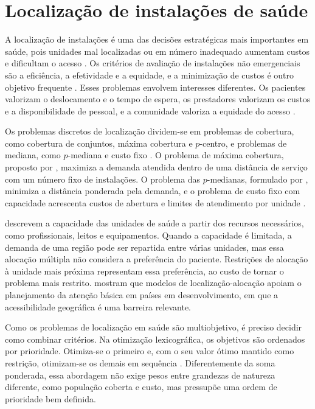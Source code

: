 \documentclass[12pt,a4paper,oneside]{report}
\begin{document}
\section{Localização de instalações de saúde}\label{sec:revlocal}

A localização de instalações é uma das decisões estratégicas mais importantes em saúde, pois unidades
mal localizadas ou em número inadequado aumentam custos e dificultam o acesso \citep{ahmadi2017}. Os
critérios de avaliação de instalações não emergenciais são a eficiência, a efetividade e a equidade, e a
minimização de custos é outro objetivo frequente \citep{ahmadi2017}. Esses problemas envolvem interesses
diferentes. Os pacientes valorizam o deslocamento e o tempo de espera, os prestadores valorizam os custos
e a disponibilidade de pessoal, e a comunidade valoriza a equidade do acesso \citep{contreras2019}.

Os problemas discretos de localização dividem-se em problemas de cobertura, como cobertura de conjuntos,
máxima cobertura e $p$-centro, e problemas de mediana, como $p$-mediana e custo fixo
\citep{daskin2008,daskin2004}. O problema de máxima cobertura, proposto por \citet{church1974}, maximiza
a demanda atendida dentro de uma distância de serviço com um número fixo de instalações. O problema das
$p$-medianas, formulado por \citet{hakimi1964}, minimiza a distância ponderada pela demanda, e o problema
de custo fixo com capacidade acrescenta custos de abertura e limites de atendimento por unidade
\citep{ahmadi2017}.

\citet{contreras2019} descrevem a capacidade das unidades de saúde a partir dos recursos necessários,
como profissionais, leitos e equipamentos. Quando a capacidade é limitada, a demanda de uma região pode
ser repartida entre várias unidades, mas essa alocação múltipla não considera a preferência do paciente.
Restrições de alocação à unidade mais próxima representam essa preferência, ao custo de tornar o
problema mais restrito. \citet{rahman2000} mostram que modelos de localização-alocação apoiam o
planejamento da atenção básica em países em desenvolvimento, em que a acessibilidade geográfica é uma
barreira relevante.

Como os problemas de localização em saúde são multiobjetivo, é preciso decidir como combinar critérios.
Na otimização lexicográfica, os objetivos são ordenados por prioridade. Otimiza-se o primeiro e, com o
seu valor ótimo mantido como restrição, otimizam-se os demais em sequência \citep{ehrgott2005}.
Diferentemente da soma ponderada, essa abordagem não exige pesos entre grandezas de natureza diferente,
como população coberta e custo, mas pressupõe uma ordem de prioridade bem definida.
\end{document}
